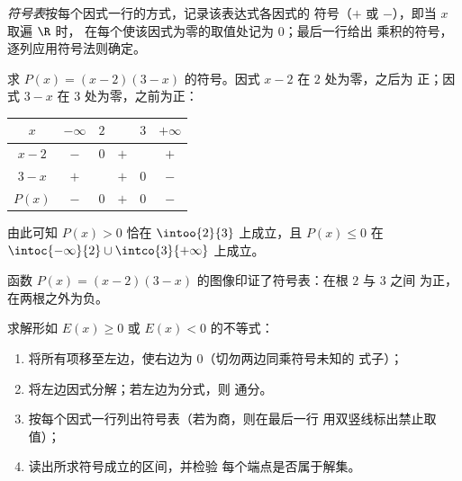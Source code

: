 \begin{definition}[符号表]\label{def:g10:algebra:signtable}
\emph{符号表}按每个因式一行的方式，记录该表达式各因式的
符号（$+$ 或 $-$），即当 $x$ 取遍 $\R$ 时，
在每个使该因式为零的取值处记为 $0$；最后一行给出
乘积的符号，逐列应用符号法则确定。
\end{definition}

\begin{example}\label{ex:g10:algebra:signtable}
求 $P(x) = (x - 2)(3 - x)$ 的符号。因式 $x - 2$ 在 $2$ 处为零，之后为
正；因式 $3 - x$ 在 $3$ 处为零，之前为正：
\begin{center}
\renewcommand{\arraystretch}{1.3}
\begin{tabular}{c|ccccc}
$x$ & $-\infty$ \quad & $2$ & & $3$ & \quad $+\infty$ \\
\hline
$x - 2$ & $-$ & $0$ & $+$ & & $+$ \\
$3 - x$ & $+$ & & $+$ & $0$ & $-$ \\
\hline
$P(x)$ & $-$ & $0$ & $+$ & $0$ & $-$ \\
\end{tabular}
\end{center}
由此可知 $P(x) > 0$ 恰在 $\intoo{2}{3}$ 上成立，且 $P(x) \leq 0$ 在
$\intoc{-\infty}{2} \cup \intco{3}{+\infty}$ 上成立。
\end{example}

\begin{omfigure}

{\small 函数 $P(x) = (x-2)(3-x)$ 的图像印证了符号表：在根 $2$ 与 $3$ 之间
为正，在两根之外为负。}
\end{omfigure}

\begin{method}[用符号表解不等式]\label{met:g10:algebra:signtable}
求解形如 $E(x) \geq 0$ 或 $E(x) < 0$ 的不等式：
\begin{enumerate}
  \item 将所有项移至左边，使右边为
        $0$（切勿两边同乘符号未知的
        式子）；
  \item 将左边因式分解；若左边为分式，则
        通分。
  \item 按每个因式一行列出符号表（若为商，则在最后一行
        用双竖线标出禁止取值）；
  \item 读出所求符号成立的区间，并检验
        每个端点是否属于解集。
\end{enumerate}
\end{method}


